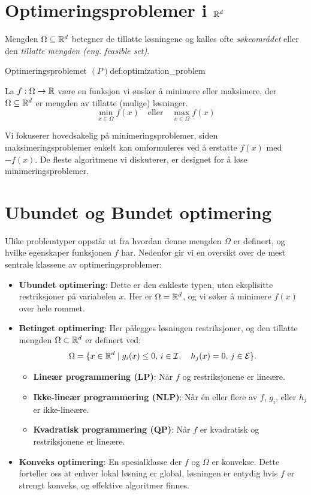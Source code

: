 \section{Optimeringsproblemer i \texorpdfstring{\(\mathbb{R}^d\)}{Rd}}

Mengden \(\Omega \subseteq \mathbb{R}^d\) betegner de tillatte løsningene og kalles ofte \emph{søkeområdet} eller den \emph{tillatte mengden (eng. feasible set)}.

\begin{definition}{Optimeringsproblemet \((P)\)}{def:optimization_problem}

	La \(f: \Omega \to \mathbb{R}\) være en funksjon vi ønsker å minimere eller maksimere, der \(\Omega \subseteq \mathbb{R}^d\) er mengden av tillatte (mulige) løsninger.
	\[
		\min_{x \in \Omega} f(x) \quad \text{eller} \quad \max_{x \in \Omega} f(x) \tag{P}
	\]

\end{definition}

Vi fokuserer hovedsakelig på minimeringsproblemer, siden maksimeringsproblemer enkelt kan omformuleres ved å erstatte \(f(x)\) med \(-f(x)\).
De fleste algoritmene vi diskuterer, er designet for å løse minimeringsproblemer.

\section{Ubundet og Bundet optimering}
Ulike problemtyper oppstår ut fra hvordan denne mengden \(\Omega\) er definert, og hvilke egenskaper funksjonen \(f\) har. Nedenfor gir vi en oversikt over de mest sentrale klassene av optimeringsproblemer:

\begin{itemize}
	\item \textbf{Ubundet optimering}: Dette er den enkleste typen, uten eksplisitte restriksjoner på variabelen \(x\). Her er \(\Omega = \mathbb{R}^d\), og vi søker å minimere \(f(x)\) over hele rommet.
	\item \textbf{Betinget optimering}: Her pålegges løsningen restriksjoner, og den tillatte mengden \(\Omega \subset \mathbb{R}^d\) er definert ved:
	      \[
		      \Omega = \{ x \in \mathbb{R}^d \mid g_i(x) \leq 0, \, i \in \mathcal{I}, \quad h_j(x) = 0, \, j \in \mathcal{E} \}.
	      \]
	      \begin{itemize}
		      \item \textbf{Lineær programmering (LP)}: Når \(f\) og restriksjonene er lineære.
		      \item \textbf{Ikke-lineær programmering (NLP)}: Når én eller flere av \(f\), \(g_i\), eller \(h_j\) er ikke-lineære.
		      \item \textbf{Kvadratisk programmering (QP)}: Når \(f\) er kvadratisk og restriksjonene er lineære.
	      \end{itemize}
	\item \textbf{Konveks optimering}: En spesialklasse der \(f\) og \(\Omega\) er konvekse.
	      Dette forteller oss at enhver lokal løsning er global, løsningen er entydig hvis \(f\) er strengt konveks, og effektive algoritmer finnes.
\end{itemize}

